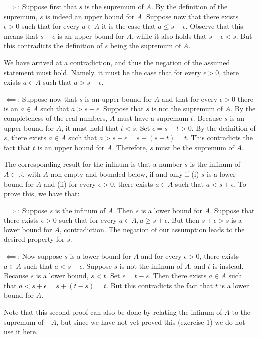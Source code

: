 \begin{solution}

    $\implies$: Suppose first that $s$ is the supremum of $A$. By the definition of the supremum, $s$ is indeed an upper bound for $A$. Suppose now that there exists $\epsilon > 0$ such that for every $a \in A$ it is the case that $a \leq s - \epsilon$. Observe that this means that $s - \epsilon$ is an upper bound for $A$, while it also holds that $s - \epsilon < s$. But this contradicts the definition of $s$ being the supremum of $A$.

    We have arrived at a contradiction, and thus the negation of the assumed statement must hold. Namely, it must be the case that for every $\epsilon > 0$, there exists $a \in A$ such that $a > s - \epsilon$.

    $\impliedby$: Suppose now that $s$ is an upper bound for $A$ and that for every $\epsilon > 0$ there is an $a \in A$ such that $a > s - \epsilon$. Suppose that $s$ is not the supremum of $A$. By the completeness of the real numbers, $A$ must have a supremum $t$. Because $s$ is an upper bound for $A$, it must hold that $t < s$. Set $\epsilon = s - t > 0$. By the definition of $s$, there exists $a \in A$ such that $a > s - \epsilon = s - (s - t) = t$. This contradicts the fact that $t$ is an upper bound for $A$. Therefore, $s$ must be the supremum of $A$.

    The corresponding result for the infinum is that a number $s$ is the infinum of $A \subset \mathbb{R}$, with $A$ non-empty and bounded below, if and only if (i) $s$ is a lower bound for $A$ and (ii) for every $\epsilon > 0$, there exists $a \in A$ such that $a < s + \epsilon$. To prove this, we have that:

    $\implies$: Suppose $s$ is the infinum of $A$. Then $s$ is a lower bound for $A$. Suppose that there exists $\epsilon > 0$ such that for every $a \in A, a \geq s + \epsilon$. But then $s + \epsilon > s$ is a lower bound for $A$, contradiction. The negation of our assumption leads to the desired property for $s$.

    $\impliedby$: Now suppose $s$ is a lower bound for $A$ and for every $\epsilon > 0$, there exists $a \in A$ such that $a < s + \epsilon$. Suppose $s$ is not the infinum of $A$, and $t$ is instead. Because $s$ is a lower bound, $s < t$. Set $\epsilon = t - s$. Then there exists $a \in A$ such that $a < s + \epsilon = s + (t-s) = t$. But this contradicts the fact that $t$ is a lower bound for $A$. 

    Note that this second proof can also be done by relating the infinum of $A$ to the supremum of $-A$, but since we have not yet proved this (exercise 1) we do not use it here.
    
\end{solution}

